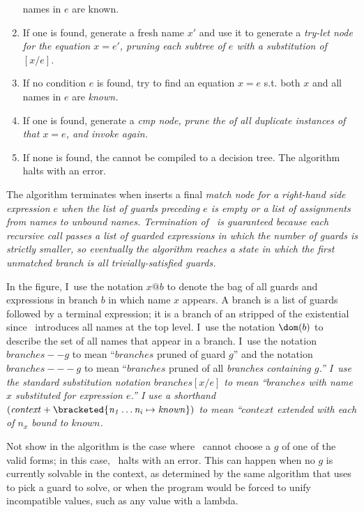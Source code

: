 \documentclass[manuscript,screen,review, 12pt, nonacm]{acmart}
\begin{document}
\begin{enumerate}
        names in $e$ are known. 
        \item If one is found, generate a fresh name $x'$ and use it to generate
        a \it{try-let} node for the equation $x = e'$, pruning each subtree of
        $e$ with a substitution of $[x/e]$. 
        \item If no condition $e$ is found, try to find an equation $x = e$ s.t.
        both $x$ and all names in $e$ are \it{known}.
        \item If one is found, generate a \it{cmp} node, prune the \iffibf of
        all duplicate instances of that $x = e$, and invoke \Compile again. 
        \item If none is found, the \iffibf cannot be compiled to a decision
        tree. The algorithm halts with an error. 
    \end{enumerate}
    \raggedbottom

    The algorithm terminates when inserts a final \it{match} node for a
    right-hand side expression $e$ when the list of guards preceding $e$ is
    empty or a list of assignments from names to unbound names. Termination of
    \DTran\ is guaranteed because each recursive call passes a list of guarded
    expressions in which the number of guards is strictly smaller, so eventually
    the algorithm reaches a state in which the first unmatched branch is all
    trivially-satisfied guards. 

    In the figure, I~use the notation $x@b$ to denote the bag of all guards and
    expressions in branch $b$ in which name $x$ appears. A branch is a list of
    guards followed by a terminal expression; it is a branch of an \iffibf
    stripped of the existential since \DTran\ introduces all names at the top
    level. I~use the notation $\dom(b)$ to describe the set of all names that
    appear in a branch. I~use the notation $\mathit{branches -- g}$ to mean
    “$\mathit{branches}$ pruned of guard $g$” and the notation $\mathit{branches
    ---g}$ to mean “$\mathit{branches}$ pruned of all \it{branches} containing
    $g$.” I~use the standard substitution notation $\mathit{branches[x/e]}$ to
    mean “$\mathit{branches}$ with name $x$ substituted for expression $e$.” I
    use a shorthand $\mathit{(context + \bracketed{n_1 \dots n_i \mapsto
    known})}$ to mean “$\mathit{context}$ extended with each of $n_x$ bound to
    $\mathit{known}$. 

    Not show in the algorithm is the case where \Compile\ cannot choose a $g$ of
    one of the valid forms; in this case, \Compile\ halts with an error. This
    can happen when no $g$ is currently solvable in the context, as determined
    by the same algorithm that \VMinus uses to pick a guard to solve, or when
    the program would be forced to unify incompatible values, such as any value
    with a lambda. 
\end{document}
